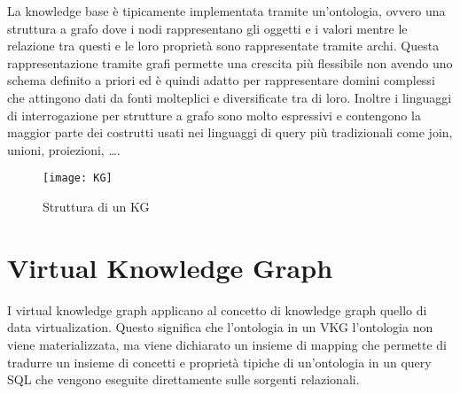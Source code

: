 La knowledge base è tipicamente implementata tramite un'ontologia, ovvero una struttura a grafo dove i nodi rappresentano gli oggetti e i valori mentre le relazione tra questi 
e le loro proprietà sono rappresentate tramite archi. Questa rappresentazione tramite grafi permette una crescita più flessibile non avendo uno schema definito a priori ed è quindi adatto
per rappresentare domini complessi che attingono dati da fonti molteplici e diversificate tra di loro. Inoltre i linguaggi di interrogazione per strutture a grafo sono molto espressivi e 
contengono la maggior parte dei costrutti usati nei linguaggi di query più tradizionali come join, unioni, proiezioni, \dots \cite{KGIntro}.


\begin{figure}[ht]
    \centering
    \texttt{[image: KG]}
    \caption{Struttura di un KG}
    \label{fig:KG}
\end{figure}


\section{Virtual Knowledge Graph}
\label{sec:vkg_description}
I virtual knowledge graph applicano al concetto di knowledge graph quello di data virtualization. Questo significa che l'ontologia in un VKG l'ontologia non viene materializzata, ma viene dichiarato un insieme di mapping 
che permette di tradurre un insieme di concetti e proprietà tipiche di un'ontologia in un query SQL che vengono eseguite direttamente sulle sorgenti relazionali. 

